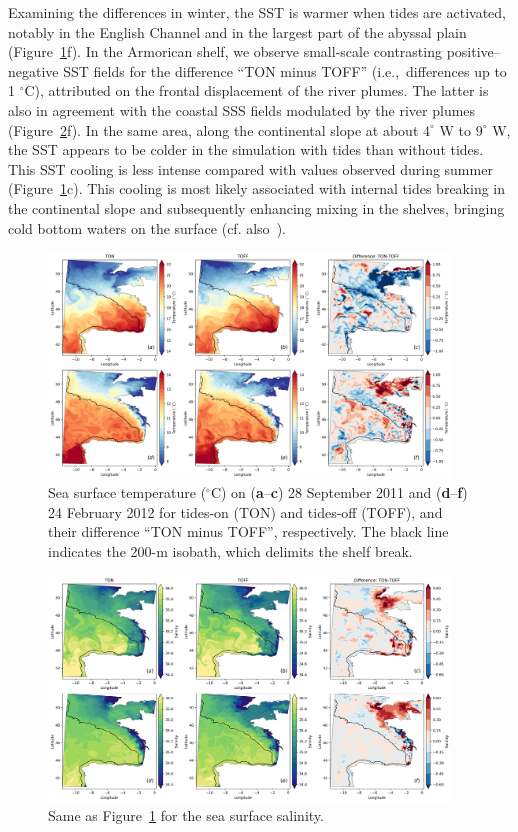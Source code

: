 \documentclass[jmse,article,accept,moreauthors,pdftex]{Definitions/mdpi}
\begin{document}
Examining the differences in winter, the SST is warmer when tides are activated, notably in the English Channel and in the largest part of the abyssal plain (Figure~\ref{fig:sst}f). In the Armorican shelf, we observe small-scale contrasting positive--negative SST fields for the difference ``TON minus TOFF'' (i.e.,~differences up to 1 $^\circ $C), attributed on the frontal displacement of the river plumes. The latter is also in agreement with the coastal SSS fields modulated by the river plumes (Figure~\ref{fig:sss}f). In the same area, along the continental slope at about $4 ^\circ$ W to $9 ^\circ$ W, the SST appears to be colder in the simulation with tides than without tides. This SST cooling is less intense compared with values observed during summer (Figure~\ref{fig:sst}c). This cooling is most likely associated with internal tides breaking in the continental slope and subsequently enhancing mixing in the shelves, bringing cold bottom waters on the surface (cf. also~\cite{PINGREE1995}). 

\begin{figure}[H]
    \centering
    \includegraphics[width=0.95\textwidth]{Definitions/figure4.png}
    \caption{Sea surface temperature ($^\circ$C) on (\textbf{a}--\textbf{c}) 28 September 2011 and (\textbf{d}--\textbf{f}) 24 February 2012 for tides-on (TON) and tides-off (TOFF), and their difference ``TON minus TOFF'', respectively. The black line indicates the 200-m isobath, which delimits the shelf break.}
    \label{fig:sst}
\end{figure}
\unskip
\begin{figure}[H]
    \centering
    \includegraphics[width=0.95\textwidth]{Definitions/figure5.png}
    \caption{{Same }%
     as Figure~\ref{fig:sst} for the sea surface salinity.}
    \label{fig:sss}
\end{figure}
\end{document}
